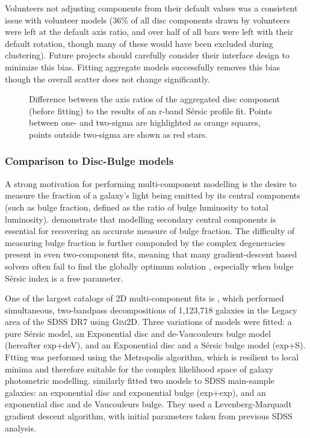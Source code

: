 \documentclass[../main.tex]{subfiles}
\begin{document}
Volunteers not adjusting components from their default values was a consistent issue with volunteer models (36\% of all disc components drawn by volunteers were left at the default axis ratio, and over half of all bars were left with their default rotation, though many of these would have been excluded during clustering). Future projects should carefully consider their interface design to minimize this bias. Fitting aggregate models successfully removes this bias though the overall scatter does not change significantly.

\begin{figure}
  \caption{Difference between the axis ratios of the aggregated disc component (before fitting) to the results of an r-band S\'ersic profile fit. Points  between one- and two-sigma are highlighted as orange squares, points outside two-sigma are shown as red stars.}
  \label{fig:ax_ratio_comparison}
\end{figure}


\subsubsection{Comparison to Disc-Bulge models}

A strong motivation for performing multi-component modelling is the desire to measure the fraction of a galaxy's light being emitted by its central components (such as bulge fraction, defined as the ratio of bulge luminosity to total luminosity). \citet{Gao2017:1709.00746v1} demonstrate that modelling secondary central components is essential for recovering an accurate measure of bulge fraction. The difficulty of measuring bulge fraction is further componded by the complex degeneracies present in even two-component fits, meaning that many gradient-descent based solvers often fail to find the globally optimum solution \citep{profit-paper}, especially when bulge S\'ersic index is a free parameter.

One of the largest catalogs of 2D multi-component fits is \citet{2011ApJS..196...11S}, which performed simultaneous, two-bandpass decompositions of 1,123,718 galaxies in the Legacy area of the SDSS DR7 using \textsc{Gim2D}. Three variations of models were fitted: a pure S\'ersic model, an Exponential disc and de-Vaucouleurs bulge model (hereafter exp+deV), and an Exponential disc and a S\'ersic bulge model (exp+S). Ftting was performed using the Metropolis algorithm, which is resilient to local minima and therefore suitable for the complex likelihood space of galaxy photometric modelling. \citet{2012MNRAS.421.2277L} similarly fitted two models to SDSS main-sample galaxies: an exponential disc and exponential bulge (exp+exp), and an exponential disc and de Vaucouleurs bulge. They used a Levenberg-Marquadt gradient descent algorithm, with initial parameters taken from previous SDSS analysis.
\end{document}
